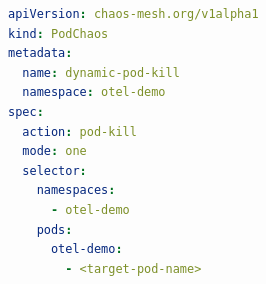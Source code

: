 \begin{lstlisting}[language=Yaml, caption={Dynamic Pod Chaos Manifest (\texttt{pod-kill})}, label={code:pod-chaos}]
apiVersion: chaos-mesh.org/v1alpha1
kind: PodChaos
metadata:
  name: dynamic-pod-kill
  namespace: otel-demo
spec:
  action: pod-kill
  mode: one
  selector:
    namespaces:
      - otel-demo
    pods:
      otel-demo:
        - <target-pod-name>
\end{lstlisting}
